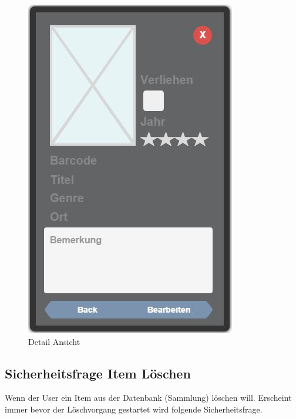 \begin{figure}[htbp]
	\centering
	\includegraphics[scale=0.5]{pic/GUI/ItemAnsicht}
	\caption{Detail Ansicht}
\end{figure}

\subsection{Sicherheitsfrage Item Löschen}

Wenn der User ein Item aus der Datenbank (Sammlung) löschen will. Erscheint immer bevor der Löschvorgang gestartet wird folgende Sicherheitsfrage.

